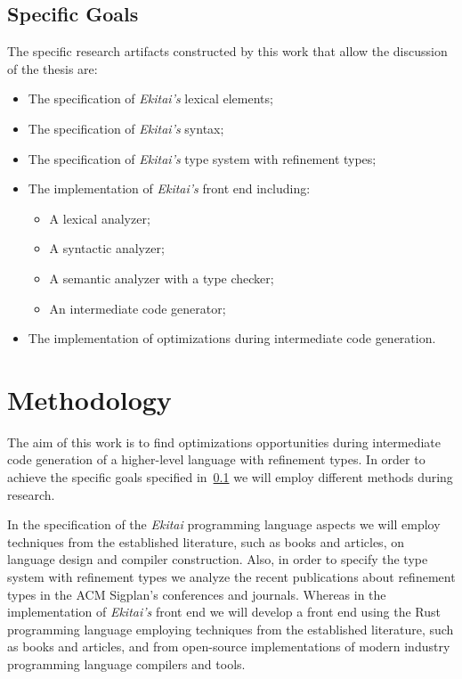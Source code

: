 \documentclass[
  oneside,
  english,
  coorientadorbanca,
  noabntexcite
]{ufsc-thesis-rn46-2019}
\begin{document}
\subsection{Specific Goals}\label{chapter:introduction:sec:goals:specific_goals}
The specific research artifacts constructed by this work that allow the discussion of the thesis are:
\begin{itemize}
  \item The specification of \textit{Ekitai's} lexical elements;
  \item The specification of \textit{Ekitai's} syntax;
  \item The specification of \textit{Ekitai's} type system with refinement types;
  \item The implementation of \textit{Ekitai's} front end including:
        \begin{itemize}
          \item A lexical analyzer;
          \item A syntactic analyzer;
          \item A semantic analyzer with a type checker;
          \item An intermediate code generator;
        \end{itemize}
  \item The implementation of optimizations during intermediate code generation.
\end{itemize}

\section{Methodology}

The aim of this work is to find optimizations opportunities during intermediate code generation of a higher-level language with refinement types.
In order to achieve the specific goals specified in~\cref{chapter:introduction:sec:goals:specific_goals} we will employ different methods during research.

In the specification of the \textit{Ekitai} programming language aspects we will employ techniques from the established literature, such as books and articles, on language design and compiler construction.
Also, in order to specify the type system with refinement types we analyze the recent publications about refinement types in the ACM Sigplan's conferences and journals.
Whereas in the implementation of \textit{Ekitai's} front end we will develop a front end using the Rust programming language employing techniques from the established literature, such as books and articles, and from open-source implementations of modern industry programming language compilers and tools.
\end{document}

